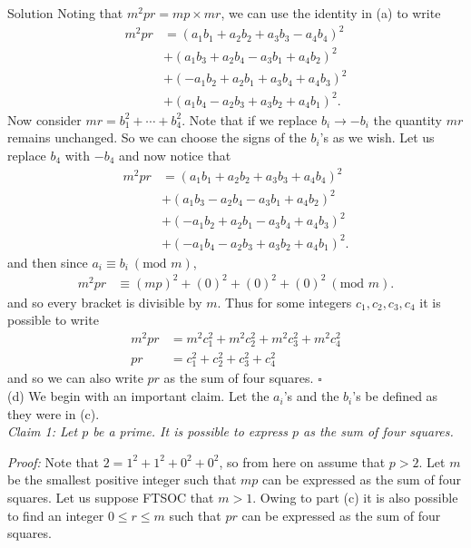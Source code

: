\documentclass{article}
\begin{document}
\begin{solution}{Solution}
Noting that $m^2pr = mp \times mr$, we can use the identity in (a) to write
\[
\begin{aligned}
m^2 pr &= (a_1 b_1 + a_2 b_2 + a_3 b_3 - a_4 b_4)^2 \\
&+ (a_1 b_3 + a_2 b_4 - a_3 b_1 + a_4 b_2)^2 \\
&+ (-a_1 b_2 + a_2 b_1 + a_3 b_4 + a_4 b_3)^2 \\
&+ (a_1 b_4 - a_2 b_3 + a_3 b_2 + a_4 b_1)^2.
\end{aligned}
\]
Now consider $mr = b_1^2 + \cdots + b_4^2$. Note that if we replace
$b_i \rightarrow -b_i$ the quantity $mr$ remains unchanged. So we can
choose the signs of the $b_i$'s as we wish. Let us replace $b_4$ with
$-b_4$ and now notice that
\[
\begin{aligned}
m^2 pr &= (a_1 b_1 + a_2 b_2 + a_3 b_3 + a_4 b_4)^2 \\
&+ (a_1 b_3 - a_2 b_4 - a_3 b_1 + a_4 b_2)^2 \\
&+ (-a_1 b_2 + a_2 b_1 - a_3 b_4 + a_4 b_3)^2 \\
&+ (-a_1 b_4 - a_2 b_3 + a_3 b_2 + a_4 b_1)^2.
\end{aligned}
\]
and then since $a_i \equiv b_i \ (\text{mod } m)$,
\[
\begin{aligned}
m^2 pr &\equiv (mp)^2
+ (0)^2
+ (0)^2
+ (0)^2 \ (\text{mod } m).
\end{aligned}
\]
and so every bracket is divisible by $m$. Thus for some integers
$c_1, c_2, c_3, c_4$ it is possible to write
\[
\begin{aligned}
m^2 pr &= m^2 c_1^2 + m^2 c_2^2 + m^2 c_3^2 + m^2 c_4^2 \\
pr &= c_1^2 + c_2^2 + c_3^2 + c_4^2
\end{aligned}
\]
and so we can also write $pr$ as the sum of four squares. $\square$
\\

(d) We begin with an important claim. Let the $a_i$'s and the $b_i$'s
be defined as they were in (c).\\

\textit{Claim 1: Let $p$ be a prime. It is possible to express $p$ as
the sum of four squares.} \vspace{0.2cm}

\textit{Proof:} Note that $2 = 1^2 + 1^2 + 0^2 + 0^2$, so from here on
assume that $p > 2$. Let $m$ be the smallest positive integer such that
$mp$ can be expressed as the sum of four squares. Let us suppose FTSOC that
$m > 1$. Owing to part (c) it is
also possible to find an integer $0 \leq r \leq m$ such that $pr$ can be
expressed as the sum of four squares.
\\


\end{solution}
\end{document}
